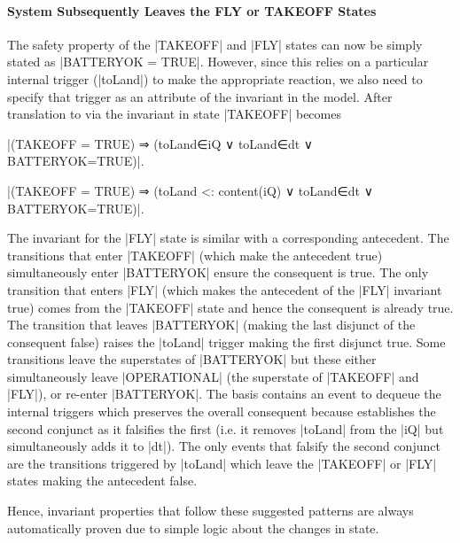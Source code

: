 \paragraph{System Subsequently Leaves the FLY or TAKEOFF States}
The safety property of the |TAKEOFF| and |FLY| states can now be simply stated as |BATTERYOK = TRUE|. 
However, since this relies on a particular internal trigger (|toLand|) to make the appropriate reaction, we also need to specify that trigger as an attribute of the invariant in the \SCXML model.
After translation to \EVENTB via \UMLB the invariant in state |TAKEOFF| becomes 
\begin{center}
 |(TAKEOFF = TRUE) ⇒ (toLand∈iQ ∨ toLand∈dt ∨ BATTERYOK=TRUE)|.
\end{center}
\begin{center}
 |(TAKEOFF = TRUE) ⇒ ({toLand} <: content(iQ) ∨ toLand∈dt ∨ BATTERYOK=TRUE)|.
\end{center}
The invariant for the |FLY| state is similar with a corresponding antecedent.
The transitions that enter |TAKEOFF| (which make the antecedent true) simultaneously enter |BATTERYOK| ensure the consequent is true.
The only transition that enters |FLY| (which makes the antecedent of the |FLY| invariant true) comes from the |TAKEOFF| state and hence the consequent is already true.
The transition that leaves |BATTERYOK| (making the last disjunct of the consequent false) raises the |toLand| trigger making the first disjunct true.
Some transitions leave the superstates of |BATTERYOK| but these either simultaneously leave |OPERATIONAL| (the superstate of |TAKEOFF| and |FLY|), or re-enter |BATTERYOK|.
The basis contains an event to dequeue the internal triggers which preserves the overall consequent because establishes the second conjunct as it falsifies the first (i.e. it removes |toLand| from the |iQ| but simultaneously adds it to |dt|).
The only events that falsify the second conjunct are the transitions triggered by |toLand| which leave the |TAKEOFF| or |FLY| states making the antecedent false.

Hence, invariant properties that follow these suggested patterns are always automatically proven due to simple logic about the changes in state.


